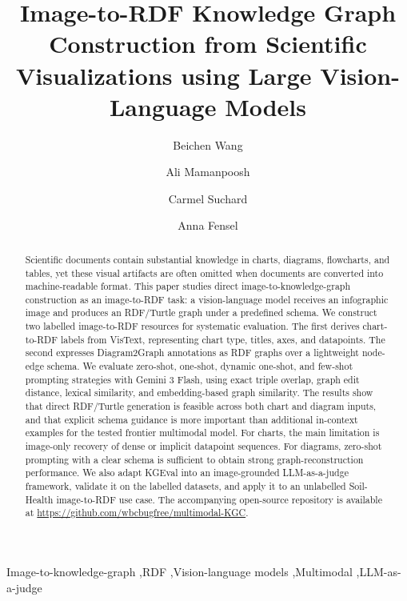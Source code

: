 \documentclass[preprint,12pt]{elsarticle}
\begin{document}
\begin{frontmatter}

\title{Image-to-RDF Knowledge Graph Construction from Scientific Visualizations using Large Vision-Language Models}

\author[inst1]{Beichen Wang}
\author[inst2]{Ali Mamanpoosh}
\author[inst3]{Carmel Suchard}
\author[inst1]{Anna Fensel}

\begin{abstract}
Scientific documents contain substantial knowledge in charts, diagrams,
flowcharts, and tables, yet these visual artifacts are often omitted when
documents are converted into machine-readable format. This paper studies
direct image-to-knowledge-graph construction as an image-to-RDF task: a
vision-language model receives an infographic image and produces an RDF/Turtle
graph under a predefined schema. We construct two labelled image-to-RDF
resources for systematic evaluation. The first derives chart-to-RDF labels from
VisText, representing chart type, titles, axes, and datapoints. The second
expresses Diagram2Graph annotations as RDF graphs over a lightweight node-edge
schema. We evaluate zero-shot, one-shot, dynamic one-shot, and few-shot
prompting strategies with Gemini 3 Flash, using exact triple overlap, graph
edit distance, lexical similarity, and embedding-based graph similarity. The
results show that direct RDF/Turtle generation is feasible across both chart
and diagram inputs, and that explicit schema guidance is more important than
additional in-context examples for the tested frontier multimodal model. For
charts, the main limitation is image-only recovery of dense or implicit datapoint sequences. For diagrams, zero-shot prompting with a
clear schema is sufficient to obtain strong graph-reconstruction performance.
We also adapt KGEval into an image-grounded LLM-as-a-judge framework, validate
it on the labelled datasets, and apply it to an unlabelled Soil-Health
image-to-RDF use case. The accompanying open-source repository is available at
\url{https://github.com/wbcbugfree/multimodal-KGC}.
\end{abstract}

\begin{keyword}
Image-to-knowledge-graph \sep RDF \sep Vision-language models \sep Multimodal \sep LLM-as-a-judge
\end{keyword}

\end{frontmatter}
\end{document}
